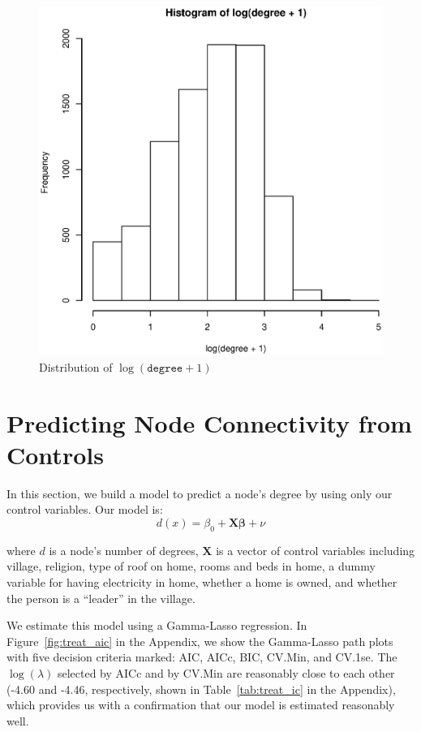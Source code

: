 \documentclass[11pt, fleqn]{article}
\begin{document}
\begin{figure}[!htb]
  \centering
  \includegraphics[scale=.5]{degrees_log.eps}
  \caption{Distribution of $\log(\texttt{degree}+1)$}
  \label{fig:log_degrees}
\end{figure}


\section{Predicting Node Connectivity from Controls}
\label{sec:predict}

In this section, we build a model to predict a node's degree by using only our control variables. Our model is: 
\begin{equation} \label{eq:treat}
d(x) = \beta_0 + \bm{X} \bm{\beta} + \nu
\end{equation}

where $d$ is a node's number of degrees, $\bm{X}$ is a vector of control variables including village, religion, type of roof on home, rooms and beds in home, a dummy variable for having electricity in home, whether a home is owned, and whether the person is a ``leader'' in the village. 

We estimate this model using a Gamma-Lasso regression. In Figure~\ref{fig:treat_aic} in the Appendix, we show the Gamma-Lasso path plots with five decision criteria marked: AIC, AICc, BIC, CV.Min, and CV.1se. The $\log(\lambda)$ selected by AICc and by CV.Min are reasonably close to each other (-4.60 and -4.46, respectively, shown in Table~\ref{tab:treat_ic} in the Appendix), which provides us with a confirmation that our model is estimated reasonably well.
\end{document}
